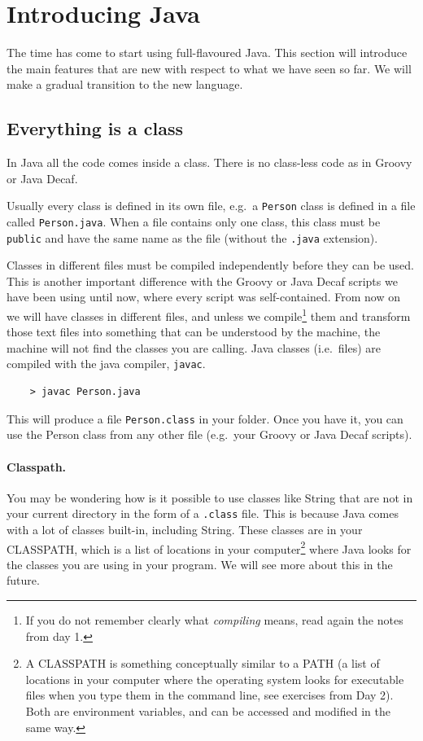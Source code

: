 
\section{Introducing Java}
\label{sec:introducing-java}

The time has come to start using full-flavoured Java. This section
will introduce the main features that are new with respect to what we
have seen so far. We will make a gradual transition to the new
language. 

\subsection{Everything is a class}
\label{sec:everything-class}

In Java all the code comes inside a class. There is no class-less
code as in Groovy or Java Decaf.

Usually every class is defined in its own file, e.g.~a \verb+Person+
class is defined in a file called \verb+Person.java+. When a file
contains only one class, this class must be \verb+public+ and have the same
name as the file (without the \verb+.java+ extension). 

Classes in different files must be compiled independently before they
can be used. This is another important difference with the Groovy or
Java Decaf
scripts we have been using until now, where every script was
self-contained. From now on we will have classes in different files,
and unless we compile\footnote{If you do not remember clearly what
  \emph{compiling} means, read again the notes from day 1. } them and
transform those text files into something that can be understood by
the machine, the machine will not find the classes you are
calling. Java classes (i.e.~files) are compiled with the java
compiler, \verb+javac+. 

\begin{verbatim}
    > javac Person.java
\end{verbatim}

This will produce a file \verb+Person.class+ in your folder. Once you
have it, you can use the Person class from any other file (e.g.~your
Groovy or Java Decaf scripts). 

\paragraph{Classpath. }
\label{sec:classpath.-}

You may be wondering how is it possible to use classes like String
that are not in your current directory in the form of a \verb+.class+
file. This is because Java comes with a lot of classes built-in,
including String. These classes are in your CLASSPATH, which is a list
of locations in your computer\footnote{A CLASSPATH is something
  conceptually similar to a PATH (a list of locations in your computer
  where the operating system looks for executable files when you type
  them in the command line, see exercises from Day 2). 
  Both are environment variables, and can be
  accessed and modified in the same way.} where Java looks for the
classes you are using in your program. We will see more about this in
the future.

